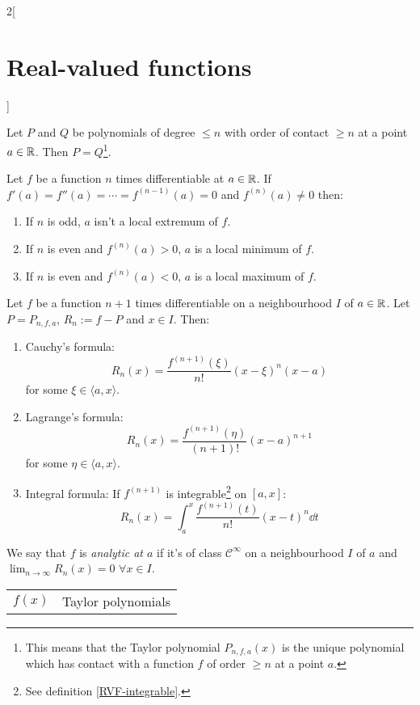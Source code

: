 \documentclass[../../../main.tex]{subfiles}
\begin{document}
\begin{multicols}{2}[\section{Real-valued functions}]
\begin{theorem}
  \end{theorem}
  \begin{prop}
    Let $P$ and $Q$ be polynomials of degree $\leq n$ with order of contact $\geq n$ at a point $a\in\mathbb{R}$. Then $P=Q$\footnote{This means that the Taylor polynomial $P_{n,f,a}(x)$ is the unique polynomial which has contact with a function $f$ of order $\geq n$ at a point $a$.}.
  \end{prop}
  \begin{theorem}
    Let $f$ be a function $n$ times differentiable at $a\in\mathbb{R}$. If $f'(a)=f''(a)=\cdots=f^{(n-1)}(a)=0$ and $f^{(n)}(a)\ne 0$ then:
    \begin{enumerate}
      \item If $n$ is odd, $a$ isn't a local extremum of $f$.
      \item If $n$ is even and $f^{(n)}(a)>0$, $a$ is a local minimum of $f$.
      \item If $n$ is even and $f^{(n)}(a)<0$, $a$ is a local maximum of $f$.
    \end{enumerate}
  \end{theorem}
  \begin{theorem}
    Let $f$ be a function $n+1$ times differentiable on a neighbourhood $I$ of $a\in\mathbb{R}$. Let $P=P_{n,f,a}$, $R_n:=f-P$ and $x\in I$. Then:
    \begin{enumerate}
      \item Cauchy's formula: $$R_n(x)=\frac{f^{(n+1)}(\xi)}{n!}{(x-\xi)}^n(x-a)$$ for some $\xi\in\langle a,x\rangle$.
      \item Lagrange's formula: $$R_n(x)=\frac{f^{(n+1)}(\eta)}{(n+1)!}{(x-a)}^{n+1}$$ for some $\eta\in\langle a,x\rangle$.
      \item Integral formula: If $f^{(n+1)}$ is integrable\footnote{See definition \ref{RVF-integrable}.} on $[a,x]$: $$R_n(x)=\int_a^x\frac{f^{(n+1)}(t)}{n!}{(x-t)}^n\dd t$$
    \end{enumerate}
  \end{theorem}
  \begin{definition}
    We say that $f$ is \textit{analytic at $a$} if it's of class $\mathcal{C}^\infty$ on a neighbourhood $I$ of $a$ and $\displaystyle\lim_{n\to\infty}R_n(x)=0$  $\forall x\in I$.
  \end{definition}
  \begin{center}
    \renewcommand*{\arraystretch}{2}
    \begin{tabular}{|c|>{\centering\arraybackslash}m{6.5cm}|}
      \hline
      $f(x)$                       & Taylor polynomials                                                                                     \\

\end{tabular}
\end{center}
\end{multicols}
\end{document}
